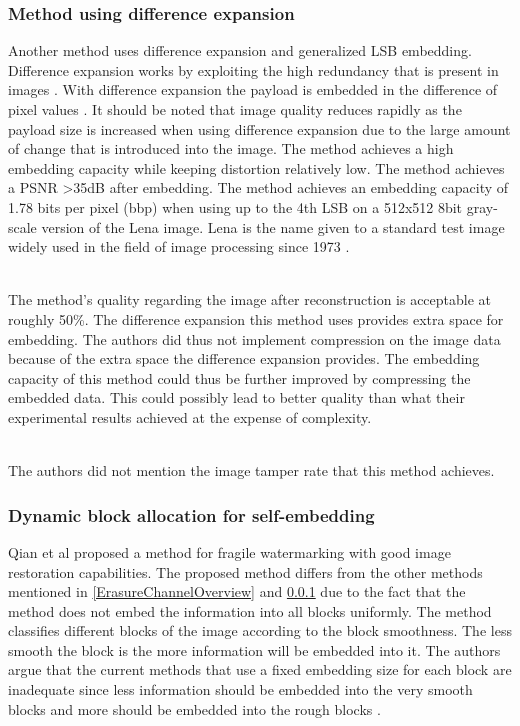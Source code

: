 \documentclass[12pt]{article}
\begin{document}
\subsubsection{Method using difference expansion}
\label{differenceExpansionOverview}
Another method \cite {tian2003high} uses difference expansion and generalized LSB embedding.
Difference expansion works by exploiting the high redundancy that is present in images \cite {tian2002reversible}.
With difference expansion the payload is embedded in the difference of pixel values \cite {tian2002reversible}. 
It should be noted that image quality reduces rapidly as the payload size is increased when using difference expansion due to the large amount of change that is introduced into the image. 
The method achieves a high embedding capacity while keeping distortion relatively low.
The method achieves a PSNR \textgreater 35dB after embedding.
The method achieves an embedding capacity of 1.78 bits per pixel (bbp) when using up to the 4th LSB on a 512x512 8bit gray-scale version of the Lena image. Lena is the name given to a standard test image widely used in the field of image processing since 1973 \cite{lenaOnlineArticle}.

\hspace{0pt} \\
The method's \cite {tian2003high} quality regarding the image after reconstruction is acceptable at roughly 50\%. 
The difference expansion this method uses provides extra space for embedding.
The authors did thus not implement compression on the image data because of the extra space the difference expansion provides.
The embedding capacity of this method could thus be further improved by compressing the embedded data. 
This could possibly lead to better quality than what their experimental results achieved at the expense of complexity.

\hspace{0pt} \\ 
The authors did not mention the image tamper rate that this method \cite {tian2003high} achieves.

\subsubsection{Dynamic block allocation for self-embedding}
\label{DynamicBlockOverview}
Qian et al \cite{qian2011image} proposed a method for fragile watermarking with good image restoration capabilities.
The proposed method differs from the other methods mentioned in \ref{ErasureChannelOverview} and \ref{differenceExpansionOverview} due to the fact that the method does not embed the information into all blocks uniformly.
The method classifies different blocks of the image according to the block smoothness.
The less smooth the block is the more information will be embedded into it.
The authors argue that the current methods that use a fixed embedding size for each block are inadequate since less information should be embedded into the very smooth blocks and more should be embedded into the rough blocks \cite{qian2011image}.
\end{document}
